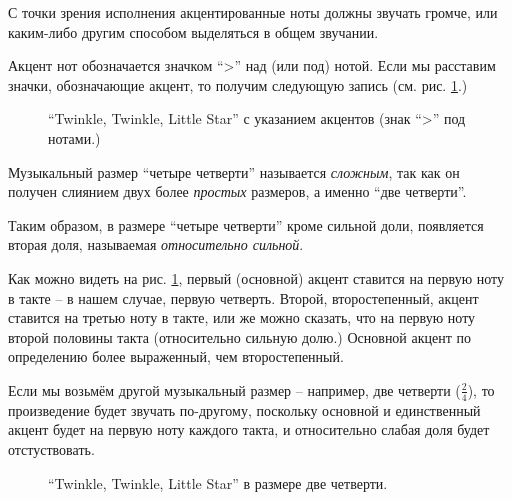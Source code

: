 \documentclass[../sparc.tex]{subfiles}
\begin{document}
С точки зрения исполнения акцентированные ноты должны звучать громче, или
каким-либо другим способом выделяться в общем звучании.

Акцент нот обозначается значком ``>'' над (или под) нотой.  Если мы расставим
значки, обозначающие акцент, то получим следующую запись
(см. рис. \ref{fig:lilypond-musical-scale-example-2}.)

\begin{figure}[ht]
  \centering
  \caption{``Twinkle, Twinkle, Little Star'' с указанием акцентов (знак ``>''
    под нотами.)}
  \label{fig:lilypond-musical-scale-example-2}
\end{figure}

Музыкальный размер ``четыре четверти'' называется \emph{сложным}, так как он
получен слиянием двух более \emph{простых} размеров, а именно ``две четверти''.

Таким образом, в размере ``четыре четверти'' кроме сильной доли, появляется
вторая доля, называемая \emph{относительно сильной}.

Как можно видеть на рис. \ref{fig:lilypond-musical-scale-example-2}, первый
(основной) акцент ставится на первую ноту в такте -- в нашем случае, первую
четверть.  Второй, второстепенный, акцент ставится на третью ноту в такте, или
же можно сказать, что на первую ноту второй половины такта (относительно сильную
долю.)  Основной акцент по определению более выраженный, чем второстепенный.

Если мы возьмём другой музыкальный размер -- например, две четверти
($\frac{2}{4}$), то произведение будет звучать по-другому, поскольку основной и
единственный акцент будет на первую ноту каждого такта, и относительно слабая
доля будет отстуствовать.

\begin{figure}[ht]
  \centering
  \caption{``Twinkle, Twinkle, Little Star'' в размере две четверти.}
  \label{fig:lilypond-musical-scale-example-3}
\end{figure}
\end{document}
